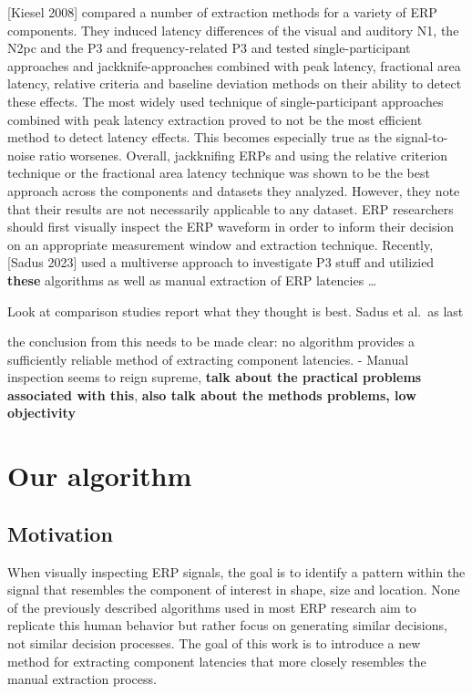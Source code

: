 \documentclass[
  man,floatsintext]{apa7}
\begin{document}
{[}Kiesel 2008{]} compared a number of extraction methods for a variety of ERP components. They induced latency differences of the visual and auditory N1, the N2pc and the P3 and frequency-related P3 and tested single-participant approaches and jackknife-approaches combined with peak latency, fractional area latency, relative criteria and baseline deviation methods on their ability to detect these effects. The most widely used technique of single-participant approaches combined with peak latency extraction proved to not be the most efficient method to detect latency effects. This becomes especially true as the signal-to-noise ratio worsenes. Overall, jackknifing ERPs and using the relative criterion technique or the fractional area latency technique was shown to be the best approach across the components and datasets they analyzed. However, they note that their results are not necessarily applicable to any dataset. ERP researchers should first visually inspect the ERP waveform in order to inform their decision on an appropriate measurement window and extraction technique.
Recently, {[}Sadus 2023{]} used a multiverse approach to investigate P3 stuff and utilizied \textbf{these} algorithms as well as manual extraction of ERP latencies \ldots{}

Look at comparison studies report what they thought is best. Sadus et al.~as last

the conclusion from this needs to be made clear: no algorithm provides a sufficiently reliable method of extracting component latencies. - Manual inspection seems to reign supreme, \textbf{talk about the practical problems associated with this}, \textbf{also talk about the methods problems, low objectivity}

\hypertarget{our-algorithm}{%
\section{Our algorithm}\label{our-algorithm}}

\hypertarget{motivation}{%
\subsection{Motivation}\label{motivation}}

When visually inspecting ERP signals, the goal is to identify a pattern within the signal that resembles the component of interest in shape, size and location. None of the previously described algorithms used in most ERP research aim to replicate this human behavior but rather focus on generating similar decisions, not similar decision processes. The goal of this work is to introduce a new method for extracting component latencies that more closely resembles the manual extraction process.
\end{document}
